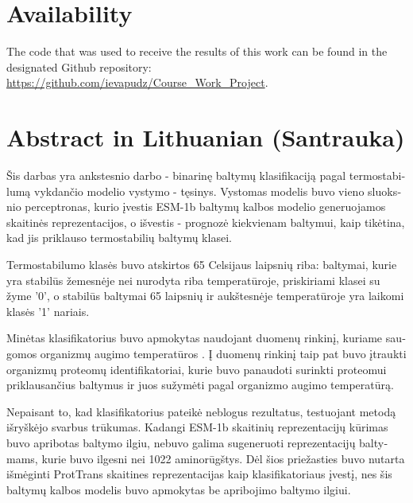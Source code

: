 \documentclass[12pt]{article}
\begin{document}
	\section{Availability}

	The code that was used to receive the results of this work can be found
	in the designated Github repository: 
	\href{https://github.com/ievapudz/Course_Work_Project}{https://github.com/ievapudz/Course\_Work\_Project}.

	\newpage

	\section{Abstract in Lithuanian (Santrauka)}

	\begin{otherlanguage}{lithuanian}
	
    Šis darbas yra ankstesnio darbo - binarinę baltymų klasifikaciją 
    pagal termostabilumą vykdančio modelio vystymo - tęsinys. Vystomas
    modelis buvo vieno sluoksnio perceptronas, kurio įvestis ESM-1b 
	\cite{rives2021biological}
    baltymų kalbos modelio generuojamos skaitinės reprezentacijos, o
    išvestis - prognozė kiekvienam baltymui, kaip tikėtina, kad jis 
    priklauso termostabilių baltymų klasei.
    
    Termostabilumo klasės buvo atskirtos 65 Celsijaus laipsnių riba:
    baltymai, kurie yra stabilūs žemesnėje nei nurodyta riba 
    temperatūroje, priskiriami klasei su žyme '0', o stabilūs 
    baltymai 65 laipsnių ir aukštesnėje temperatūroje yra 
    laikomi klasės '1' nariais.
    
    Minėtas klasifikatorius buvo apmokytas naudojant duomenų rinkinį, 
	kuriame
    saugomos organizmų augimo temperatūros 
	\cite{engqvist_martin_karl_magnus_2018_1175609}. Į duomenų rinkinį 
	taip pat
    buvo įtraukti organizmų proteomų identifikatoriai, kurie buvo
    panaudoti surinkti proteomui priklausančius baltymus ir juos 
    sužymėti pagal organizmo augimo temperatūrą.

    Nepaisant to, kad klasifikatorius pateikė neblogus rezultatus,
    testuojant metodą išryškėjo svarbus trūkumas. Kadangi ESM-1b
    skaitinių reprezentacijų kūrimas buvo apribotas baltymo ilgiu,
    nebuvo galima sugeneruoti reprezentacijų baltymams, kurie buvo 
    ilgesni nei 1022 aminorūgštys. Dėl šios priežasties buvo nutarta
    išmėginti ProtTrans \cite{elnaggar2020prottrans} skaitines 
	reprezentacijas kaip klasifikatoriaus
    įvestį, nes šis baltymų kalbos modelis buvo apmokytas be apribojimo 
    baltymo ilgiui. 


\end{otherlanguage}
\end{document}
